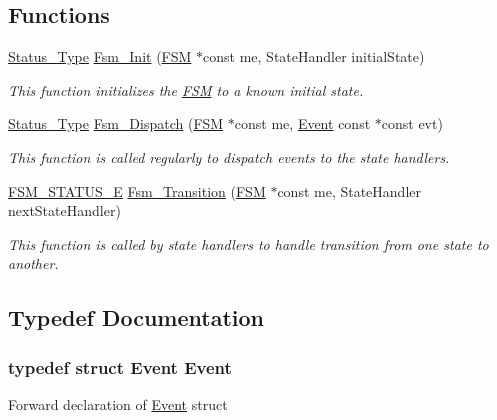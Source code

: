 \subsection*{Functions}
\begin{DoxyCompactItemize}
\item 
\hyperlink{group___f_s_m_ga3ef97600b5131dbf1b9a798e760e9268}{Status\_\-Type} \hyperlink{group___f_s_m_ga642a33b2ed914211fa65a9a802217532}{Fsm\_\-Init} (\hyperlink{struct_f_s_m}{FSM} $\ast$const me, StateHandler initialState)
\begin{DoxyCompactList}\small\item\em This function initializes the \hyperlink{struct_f_s_m}{FSM} to a known initial state. \end{DoxyCompactList}\item 
\hyperlink{group___f_s_m_ga3ef97600b5131dbf1b9a798e760e9268}{Status\_\-Type} \hyperlink{group___f_s_m_gaa985b514837a40bd2ab5bfb558c430e1}{Fsm\_\-Dispatch} (\hyperlink{struct_f_s_m}{FSM} $\ast$const me, \hyperlink{struct_event}{Event} const $\ast$const evt)
\begin{DoxyCompactList}\small\item\em This function is called regularly to dispatch events to the state handlers. \end{DoxyCompactList}\item 
\hyperlink{group___f_s_m_ga64d3de8a4121adac058d8a5e116d9b7d}{FSM\_\-STATUS\_\-E} \hyperlink{group___f_s_m_gac25b316d591ebf1763aeed9ab0eaae58}{Fsm\_\-Transition} (\hyperlink{struct_f_s_m}{FSM} $\ast$const me, StateHandler nextStateHandler)
\begin{DoxyCompactList}\small\item\em This function is called by state handlers to handle transition from one state to another. \end{DoxyCompactList}\end{DoxyCompactItemize}


\subsection{Typedef Documentation}
\subsubsection[{Event}]{\setlength{\rightskip}{0pt plus 5cm}typedef struct {\bf Event} {\bf Event}}\label{group___f_s_m_ga607b119a19e65e2c1c7a606f21ab7a46}
Forward declaration of \hyperlink{struct_event}{Event} struct 
